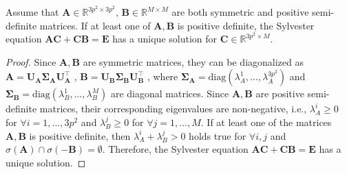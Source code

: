 \begin{theorem}
Assume that $\bm{A}\in\mathbb{R}^{3p^2\times 3p^2}$, $\bm{B}\in\mathbb{R}^{M\times M}$ are both symmetric and positive semi-definite matrices. If at least one of $\bm{A}, \bm{B}$ is positive definite, the Sylvester equation $\bm{A}\bm{C}
+
\bm{C}\bm{B}
=
\bm{E}$ has a unique solution for $\bm{C}\in \mathbb{R}^{3p^2\times M}$.
\end{theorem}
\vspace{-4mm}
\begin{proof}
Since $\bm{A}, \bm{B}$ are symmetric matrices, they can be diagonalized as 
$
\bm{A}
=
\bm{U}_{\bm{A}}\bm{\Sigma}_{\bm{A}}\bm{U}_{\bm{A}}^{\top}
$
,
$
\bm{B}
=
\bm{U}_{\bm{B}}\bm{\Sigma}_{\bm{B}}\bm{U}_{\bm{B}}^{\top}
$
,
where $\bm{\Sigma}_{\bm{A}}=\text{diag}(\lambda_{A}^{1},...,\lambda_{A}^{3p^2})$ and $\bm{\Sigma}_{\bm{B}}=\text{diag}(\lambda_{B}^{1},...,\lambda_{B}^{M})$ are diagonal matrices. Since $\bm{A}, \bm{B}$ are positive semi-definite matrices, their corresponding eigenvalues are non-negative, i.e., $\lambda_{A}^{i}\ge0$ for $\forall i=1,...,3p^2$ and $\lambda_{B}^{j}\ge0$ for $\forall j=1,...,M$. If at least one of the matrices $\bm{A}, \bm{B}$ is positive definite, then $\lambda_{A}^{i}+\lambda_{B}^{j}>0$ holds true for $\forall i, j$ and $\sigma(\bm{A})\cap\sigma(\bm{-B})=\emptyset$. Therefore, the Sylvester equation $\bm{A}\bm{C}
+
\bm{C}\bm{B}
=
\bm{E}$ has a unique solution.
\end{proof}


